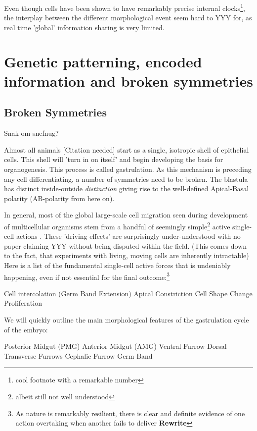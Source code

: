 Even though cells have been shown to have remarkably precise internal clocks\footnote{cool footnote with a remarkable number}\cite{}, the interplay between the different morphological event seem hard to YYY for, as real time 'global' information sharing is very limited.


\section{Genetic patterning, encoded information and broken symmetries}
\subsection{Broken Symmetries}

Snak om snefnug?

Almost all animals [Citation needed] start as a single, isotropic shell of epithelial cells. This shell will 'turn in on itself' and begin developing the basis for organogenesis. This process is called gastrulation. As this mechanism is preceding any cell differentiating, a number of symmetries need to be broken. The blastula has distinct inside-outside \textit{distinction} giving rise to the well-defined Apical-Basal polarity (AB-polarity from here on).


In general, most of the global large-scale cell migration seen during development of multicellular organisms stem from a handful of seemingly simple\footnote{albeit still not well understood} active single-cell actions \cite{walck2014cell}. These 'driving effects' are surprisingly under-understood with no paper claiming YYY without being disputed within the field. (This comes down to the fact, that experiments with living, moving cells are inherently intractable) Here is a list of the fundamental single-cell active forces that is undeniably happening, even if not essential for the final outcome:\footnote{As nature is remarkably resilient, there is clear and definite evidence of one action overtaking when another fails to deliver \cite{butler2009cell} \textbf{Rewrite}} 
\begin{outline}
    \1 Cell intercolation (Germ Band Extension)
    \1 Apical Constriction
    \1 Cell Shape Change
    \1 Proliferation
\end{outline}

We will quickly outline the main morphological features of the gastrulation cycle of the embryo:
\begin{outline}
    \1 Posterior Midgut (PMG)
    \1 Anterior Midgut (AMG)
    \1 Ventral Furrow
    \1 Dorsal Transverse Furrows
    \1 Cephalic Furrow
    \1 Germ Band
\end{outline}

